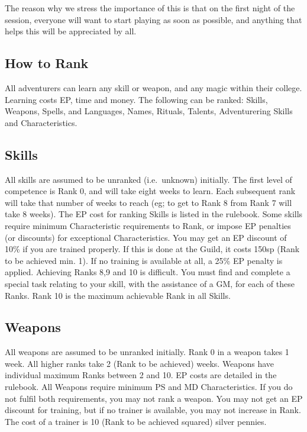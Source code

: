\documentclass[twoside,a4paper]{article}
\begin{document}
\begin{multicols}{2}
The reason why we stress the importance of this is that on the first
night of the session, everyone will want to start playing as soon as
possible, and anything that helps this will be appreciated by all.

\subsection{How to Rank}

All adventurers can learn any skill or weapon, and any magic within
their college. Learning costs EP, time and money.  The following can
be ranked: Skills, Weapons, Spells, and Languages, Names, Rituals,
Talents, Adventurering Skills and Characteristics.

\subsection{Skills}

All skills are assumed to be unranked (i.e.\ unknown) initially. The
first level of competence is Rank 0, and will take eight weeks to
learn. Each subsequent rank will take that number of weeks to reach
(eg; to get to Rank 8 from Rank 7 will take 8 weeks). The EP cost for
ranking Skills is listed in the rulebook.  Some skills require minimum
Characteristic requirements to Rank, or impose EP penalties (or
discounts) for exceptional Characteristics.  You may get an EP
discount of 10\% if you are trained properly. If this is done at the
Guild, it costs 150sp \x (Rank to be achieved min. 1). If no training
is available at all, a 25\% EP penalty is applied.  Achieving Ranks
8,9 and 10 is difficult.  You must find and complete a special task
relating to your skill, with the assistance of a GM, for each of these
Ranks. Rank 10 is the maximum achievable Rank in all Skills.

\subsection{Weapons}

All weapons are assumed to be unranked initially.  Rank 0 in a weapon
takes 1 week. All higher ranks take 2 \x (Rank to be achieved)
weeks. Weapons have individual maximum Ranks between 2 and 10.  EP
costs are detailed in the rulebook.  All Weapons require minimum PS
and MD Characteristics. If you do not fulfil both requirements, you
may not rank a weapon.  You may not get an EP discount for training,
but if no trainer is available, you may not increase in Rank.  The
cost of a trainer is 10 \x (Rank to be achieved squared) silver
pennies.


\end{multicols}
\end{document}
